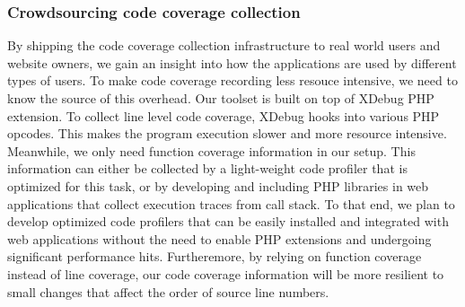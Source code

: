 \subsubsection{Crowdsourcing code coverage collection}
By shipping the code coverage collection infrastructure to real world users and website owners, we gain an insight into how the applications are used by different types of users. To make code coverage recording less resouce intensive, we need to know the source of this overhead.
Our toolset is built on top of XDebug PHP extension. To collect line level code coverage, XDebug hooks into various PHP opcodes. This makes the program execution slower and more resource intensive. Meanwhile, we only need function coverage information in our setup. This information can either be collected by a light-weight code profiler that is optimized for this task, or by developing and including PHP libraries in web applications that collect execution traces from call stack. To that end, we plan to develop optimized code profilers that can be easily installed and integrated with web applications without the need to enable PHP extensions and undergoing significant performance hits. Furtheremore, by relying on function coverage instead of line coverage, our code coverage information will be more resilient to small changes that affect the order of source line numbers.
